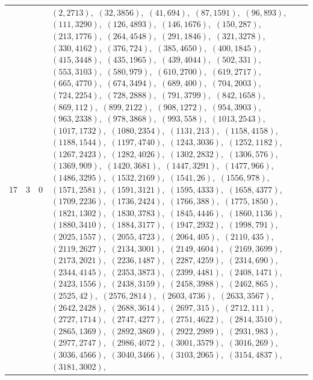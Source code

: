 \documentclass[11pt]{article}
\begin{document}
\begin{longtable}{@{}rrl>{\raggedright\arraybackslash}p{}@{}}
17 & 3 & $0$ & $(2,2713)$,\allowbreak\ $(32,3856)$,\allowbreak\ $(41,694)$,\allowbreak\ $(87,1591)$,\allowbreak\ $(96,893)$,\allowbreak\ $(111,3290)$,\allowbreak\ $(126,4893)$,\allowbreak\ $(146,1676)$,\allowbreak\ $(150,287)$,\allowbreak\ $(213,1776)$,\allowbreak\ $(264,4548)$,\allowbreak\ $(291,1846)$,\allowbreak\ $(321,3278)$,\allowbreak\ $(330,4162)$,\allowbreak\ $(376,724)$,\allowbreak\ $(385,4650)$,\allowbreak\ $(400,1845)$,\allowbreak\ $(415,3448)$,\allowbreak\ $(435,1965)$,\allowbreak\ $(439,4044)$,\allowbreak\ $(502,331)$,\allowbreak\ $(553,3103)$,\allowbreak\ $(580,979)$,\allowbreak\ $(610,2700)$,\allowbreak\ $(619,2717)$,\allowbreak\ $(665,4770)$,\allowbreak\ $(674,3494)$,\allowbreak\ $(689,400)$,\allowbreak\ $(704,2003)$,\allowbreak\ $(724,2254)$,\allowbreak\ $(728,2888)$,\allowbreak\ $(791,3799)$,\allowbreak\ $(842,1658)$,\allowbreak\ $(869,112)$,\allowbreak\ $(899,2122)$,\allowbreak\ $(908,1272)$,\allowbreak\ $(954,3903)$,\allowbreak\ $(963,2338)$,\allowbreak\ $(978,3868)$,\allowbreak\ $(993,558)$,\allowbreak\ $(1013,2543)$,\allowbreak\ $(1017,1732)$,\allowbreak\ $(1080,2354)$,\allowbreak\ $(1131,213)$,\allowbreak\ $(1158,4158)$,\allowbreak\ $(1188,1544)$,\allowbreak\ $(1197,4740)$,\allowbreak\ $(1243,3036)$,\allowbreak\ $(1252,1182)$,\allowbreak\ $(1267,2423)$,\allowbreak\ $(1282,4026)$,\allowbreak\ $(1302,2832)$,\allowbreak\ $(1306,576)$,\allowbreak\ $(1369,909)$,\allowbreak\ $(1420,3681)$,\allowbreak\ $(1447,3291)$,\allowbreak\ $(1477,966)$,\allowbreak\ $(1486,3295)$,\allowbreak\ $(1532,2169)$,\allowbreak\ $(1541,26)$,\allowbreak\ $(1556,978)$,\allowbreak\ $(1571,2581)$,\allowbreak\ $(1591,3121)$,\allowbreak\ $(1595,4333)$,\allowbreak\ $(1658,4377)$,\allowbreak\ $(1709,2236)$,\allowbreak\ $(1736,2424)$,\allowbreak\ $(1766,388)$,\allowbreak\ $(1775,1850)$,\allowbreak\ $(1821,1302)$,\allowbreak\ $(1830,3783)$,\allowbreak\ $(1845,4446)$,\allowbreak\ $(1860,1136)$,\allowbreak\ $(1880,3410)$,\allowbreak\ $(1884,3177)$,\allowbreak\ $(1947,2932)$,\allowbreak\ $(1998,791)$,\allowbreak\ $(2025,1557)$,\allowbreak\ $(2055,4723)$,\allowbreak\ $(2064,405)$,\allowbreak\ $(2110,435)$,\allowbreak\ $(2119,2627)$,\allowbreak\ $(2134,3001)$,\allowbreak\ $(2149,4604)$,\allowbreak\ $(2169,3699)$,\allowbreak\ $(2173,2021)$,\allowbreak\ $(2236,1487)$,\allowbreak\ $(2287,4259)$,\allowbreak\ $(2314,690)$,\allowbreak\ $(2344,4145)$,\allowbreak\ $(2353,3873)$,\allowbreak\ $(2399,4481)$,\allowbreak\ $(2408,1471)$,\allowbreak\ $(2423,1556)$,\allowbreak\ $(2438,3159)$,\allowbreak\ $(2458,3988)$,\allowbreak\ $(2462,865)$,\allowbreak\ $(2525,42)$,\allowbreak\ $(2576,2814)$,\allowbreak\ $(2603,4736)$,\allowbreak\ $(2633,3567)$,\allowbreak\ $(2642,2428)$,\allowbreak\ $(2688,3614)$,\allowbreak\ $(2697,315)$,\allowbreak\ $(2712,111)$,\allowbreak\ $(2727,1714)$,\allowbreak\ $(2747,4277)$,\allowbreak\ $(2751,4622)$,\allowbreak\ $(2814,3510)$,\allowbreak\ $(2865,1369)$,\allowbreak\ $(2892,3869)$,\allowbreak\ $(2922,2989)$,\allowbreak\ $(2931,983)$,\allowbreak\ $(2977,2747)$,\allowbreak\ $(2986,4072)$,\allowbreak\ $(3001,3579)$,\allowbreak\ $(3016,269)$,\allowbreak\ $(3036,4566)$,\allowbreak\ $(3040,3466)$,\allowbreak\ $(3103,2065)$,\allowbreak\ $(3154,4837)$,\allowbreak\ $(3181,3002)$,\allowbreak\ 
\end{longtable}
\end{document}
